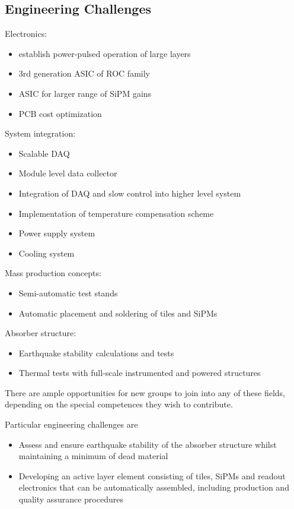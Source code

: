 \subsection{Engineering Challenges}

Electronics:
\begin{itemize}
\item establish power-pulsed operation of large layers
\item 3rd generation ASIC of ROC family
\item ASIC for larger range of SiPM gains
\item PCB cost optimization
\end{itemize}

System integration:
\begin{itemize}
\item Scalable DAQ
\item Module level data collector
\item Integration of DAQ and slow control into higher level system
\item Implementation of temperature compensation scheme
\item Power supply system
\item Cooling system
\end{itemize}

Mass production concepts:
\begin{itemize}
\item Semi-automatic test stands
\item Automatic placement and soldering of tiles and SiPMs
\end{itemize}

Absorber structure:
\begin{itemize}
\item Earthquake stability calculations and tests
\item Thermal tests with full-scale instrumented and powered structures
\end{itemize}

There are ample opportunities for new groups to join into any of these fields, depending on the special competences they wish to contribute.

Particular engineering challenges are
\begin{itemize}
\item Assess and ensure earthquake stability of the absorber structure whilst maintaining a minimum of dead material
\item Developing an active layer element consisting of tiles, SiPMs and readout electronics that can be automatically assembled, including production and quality assurance procedures
\end{itemize}
